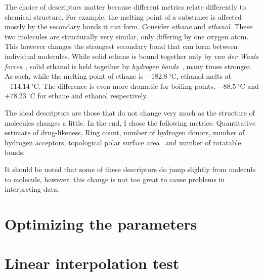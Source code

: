 The choice of descriptors matter because different metrics relate differently to chemical structure. For example, the melting point of a substance is affected mostly by the secondary bonds it can form. Consider \textit{ethane} and \textit{ethanol}. These two molecules are structurally very similar, only differing by one oxygen atom. This however changes the strongest secondary bond that can form between individual molecules. While solid ethane is bound together only by \textit{van der Waals forces}~\cite{bib:vanderwaals}, solid ethanol is held together by \textit{hydrogen bonds}~\cite{bib:hbond}, many times stronger. As such, while the melting point of ethane is $-182.8~^\circ$C, ethanol melts at $-114.14~^\circ$C. The difference is even more dramatic for boiling points, $-88.5~^\circ$C and $+78.23~^\circ$C for ethane and ethanol respectively.

The ideal descriptors are those that do not change very much as the structure of molecules changes a little. In the end, I chose the following metrics: Quantitative estimate of drug-likeness, Ring count, number of hydrogen donors, number of hydrogen acceptors, topological polar surface area~\cite{bib:tpsa} and number of rotatable bonds.

It should be noted that some of these descriptors do jump slightly from molecule to molecule, however, this change is not too great to cause problems in interpreting data.


\section{Optimizing the parameters}\label{sec:optimizing-the-parameters}



\section{Linear interpolation test}\label{sec:linear-interpolation-test}

